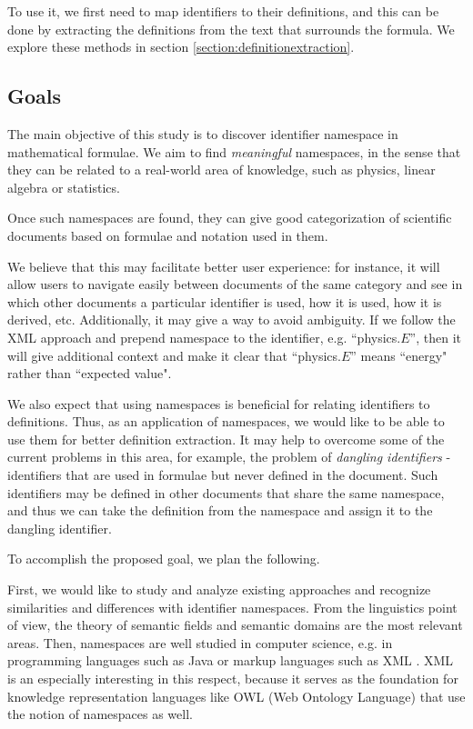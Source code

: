 To use it, we first need to map identifiers to their definitions, and this can be done by
extracting the definitions from the text that surrounds the formula. We explore these methods 
in section \ref{section:definitionextraction}.




\subsection{Goals}

The main objective of this study is to discover identifier namespace in mathematical formulae.
We aim to find \emph{meaningful} namespaces, in the sense that they can be related to a real-world area of knowledge, such as physics, linear algebra or statistics.

Once such namespaces are found, they can give good categorization of scientific documents based on formulae and notation used in them.

We believe that this may facilitate better user experience: for instance, it will allow users to navigate easily between documents of the same category and see in which other documents a particular identifier is used, how it is used, how it is derived, etc. Additionally, it may give a way to avoid ambiguity. If we follow the XML approach \cite{xmlnamespaces} and prepend namespace to the identifier, e.g. ``physics.$E$'', then it will give additional context and make it clear that ``physics.$E$'' means ``energy" rather than ``expected value".

We also expect that using namespaces is beneficial for relating identifiers to definitions. Thus, as an application of namespaces, we would like to be able to use them for better definition extraction. It may help to overcome some of the current problems in this area, for example, the problem of \emph{dangling identifiers} \cite{pagael2014mlp} - identifiers that are used in formulae but never defined in the document. Such identifiers may be defined in other documents that share the same namespace, and thus we can take the definition from the namespace and assign it to the dangling identifier.


To accomplish the proposed goal, we plan the following.

First, we would like to study and analyze existing approaches and recognize similarities and differences with identifier namespaces. From the linguistics point of view, the theory of semantic fields \cite{vassilyev1974theory} and semantic domains \cite{gliozzo2009semantic} are the most relevant areas. Then, namespaces are well studied in computer science, e.g. in programming languages such as Java \cite{gosling2014java} or markup languages such as XML \cite{xmlnamespaces}. XML is an especially interesting in this respect, because it serves as the foundation for knowledge representation languages like OWL (Web Ontology Language) \cite{mcguinness2004owl} that use the notion of namespaces as well.

